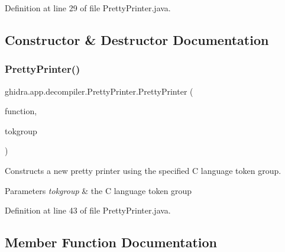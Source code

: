 Definition at line 29 of file Pretty\+Printer.\+java.



\subsection{Constructor \& Destructor Documentation}
\mbox{\label{classghidra_1_1app_1_1decompiler_1_1_pretty_printer_adc2f50aa944639655ee214975112dd30}} 
\subsubsection{\texorpdfstring{PrettyPrinter()}{PrettyPrinter()}}
{\footnotesize\ttfamily ghidra.\+app.\+decompiler.\+Pretty\+Printer.\+Pretty\+Printer (\begin{DoxyParamCaption}\item[{Function}]{function,  }\item[{\mbox{\hyperlink{classghidra_1_1app_1_1decompiler_1_1_clang_token_group}{Clang\+Token\+Group}}}]{tokgroup }\end{DoxyParamCaption})\hspace{0.3cm}{\ttfamily [inline]}}

Constructs a new pretty printer using the specified C language token group. 
\begin{DoxyParams}{Parameters}
{\em tokgroup} & the C language token group \\
\hline
\end{DoxyParams}


Definition at line 43 of file Pretty\+Printer.\+java.



\subsection{Member Function Documentation}
\mbox{\label{classghidra_1_1app_1_1decompiler_1_1_pretty_printer_a08a4aabc621b7f5e68abf8d4a0a3b4c8}} 
